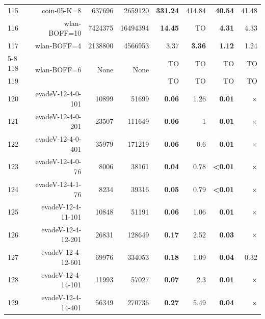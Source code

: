 \begin{longtable}{lrr@{\hskip 12pt}r@{\hskip 12pt}r@{\hskip 12pt}r@{\hskip 12pt}r@{\hskip 12pt}r}
115 & \multirow{1}{*}{coin-05-K=8} & \multirow{1}{*}{637696} & \multirow{1}{*}{2659120} & \textbf{331.24} & 414.84 & \textbf{40.54} & 41.48 \\
116 & \multirow{1}{*}{wlan-BOFF=10} & \multirow{1}{*}{7424375} & \multirow{1}{*}{16494394} & \textbf{14.45} & TO & \textbf{4.31} & 4.33 \\
117 & \multirow{1}{*}{wlan-BOFF=4} & \multirow{1}{*}{2138800} & \multirow{1}{*}{4566953} & 3.37 & \textbf{3.36} & \textbf{1.12} & 1.24 \\
\cmidrule{5-8}
118 & \multirow{2}{*}{wlan-BOFF=6} & \multirow{2}{*}{None} & \multirow{2}{*}{None} & TO & TO & TO & TO \\
119 &  &  &  & TO & TO & TO & TO \\
\midrule
120 & \multirow{1}{*}{evadeV-12-4-0-101} & \multirow{1}{*}{10899} & \multirow{1}{*}{51699} & \textbf{0.06} & 1.26 & \textbf{0.01} & $\times$ \\
121 & \multirow{1}{*}{evadeV-12-4-0-201} & \multirow{1}{*}{23507} & \multirow{1}{*}{111649} & \textbf{0.06} & 1 & \textbf{0.01} & $\times$ \\
122 & \multirow{1}{*}{evadeV-12-4-0-401} & \multirow{1}{*}{35979} & \multirow{1}{*}{171219} & \textbf{0.06} & 0.6 & \textbf{0.01} & $\times$ \\
123 & \multirow{1}{*}{evadeV-12-4-0-76} & \multirow{1}{*}{8006} & \multirow{1}{*}{38161} & \textbf{0.04} & 0.78 & \textbf{<0.01} & $\times$ \\
124 & \multirow{1}{*}{evadeV-12-4-1-76} & \multirow{1}{*}{8234} & \multirow{1}{*}{39316} & \textbf{0.05} & 0.79 & \textbf{<0.01} & $\times$ \\
125 & \multirow{1}{*}{evadeV-12-4-11-101} & \multirow{1}{*}{10848} & \multirow{1}{*}{51191} & \textbf{0.06} & 1.06 & \textbf{0.01} & $\times$ \\
126 & \multirow{1}{*}{evadeV-12-4-12-201} & \multirow{1}{*}{26831} & \multirow{1}{*}{128649} & \textbf{0.17} & 2.52 & \textbf{0.03} & $\times$ \\
127 & \multirow{1}{*}{evadeV-12-4-12-601} & \multirow{1}{*}{69976} & \multirow{1}{*}{334053} & \textbf{0.18} & 1.09 & \textbf{0.04} & 0.32 \\
128 & \multirow{1}{*}{evadeV-12-4-14-101} & \multirow{1}{*}{11993} & \multirow{1}{*}{57027} & \textbf{0.07} & 2.3 & \textbf{0.01} & $\times$ \\
129 & \multirow{1}{*}{evadeV-12-4-14-401} & \multirow{1}{*}{56349} & \multirow{1}{*}{270736} & \textbf{0.27} & 5.49 & \textbf{0.04} & $\times$ \\

\end{longtable}

